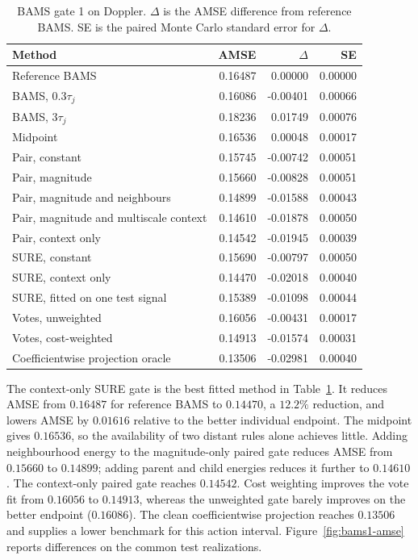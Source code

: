 \documentclass[11pt]{article}
\theoremstyle{plain}
\theoremstyle{definition}
\theoremstyle{remark}
\begin{document}
\begin{table}[!htbp]
\centering
\small
\caption{BAMS gate 1 on Doppler. $\Delta$ is the AMSE difference from reference BAMS. SE is the paired Monte Carlo standard error for $\Delta$.}
\label{tab:bams1-risk}
\begin{tabular}{lrrr}
\toprule
Method & AMSE & $\Delta$ & SE \\
\midrule
Reference BAMS & 0.16487 & 0.00000 & 0.00000 \\
BAMS, $0.3\tau_j$ & 0.16086 & -0.00401 & 0.00066 \\
BAMS, $3\tau_j$ & 0.18236 & 0.01749 & 0.00076 \\
Midpoint & 0.16536 & 0.00048 & 0.00017 \\
Pair, constant & 0.15745 & -0.00742 & 0.00051 \\
Pair, magnitude & 0.15660 & -0.00828 & 0.00051 \\
Pair, magnitude and neighbours & 0.14899 & -0.01588 & 0.00043 \\
Pair, magnitude and multiscale context & 0.14610 & -0.01878 & 0.00050 \\
Pair, context only & 0.14542 & -0.01945 & 0.00039 \\
SURE, constant & 0.15690 & -0.00797 & 0.00050 \\
SURE, context only & 0.14470 & -0.02018 & 0.00040 \\
SURE, fitted on one test signal & 0.15389 & -0.01098 & 0.00044 \\
Votes, unweighted & 0.16056 & -0.00431 & 0.00017 \\
Votes, cost-weighted & 0.14913 & -0.01574 & 0.00031 \\
Coefficientwise projection oracle & 0.13506 & -0.02981 & 0.00040 \\
\bottomrule
\end{tabular}
\end{table}

The context-only SURE gate is the best fitted method in
Table~\ref{tab:bams1-risk}. It reduces AMSE from $0.16487$ for reference BAMS
to $0.14470$, a $12.2\%$ reduction, and lowers AMSE by $0.01616$ relative to the
better individual endpoint. The midpoint gives $0.16536$, so the availability
of two distant rules alone achieves little. Adding neighbourhood energy
to the magnitude-only paired gate reduces AMSE from $0.15660$ to $0.14899$;
adding parent and child energies reduces it further to $0.14610$. The
context-only paired gate reaches $0.14542$. Cost weighting improves the
vote fit from $0.16056$ to $0.14913$, whereas the unweighted gate barely
improves on the better endpoint ($0.16086$). The clean coefficientwise
projection reaches $0.13506$ and supplies a lower benchmark for this
action interval. Figure~\ref{fig:bams1-amse} reports differences on the
common test realizations.
\end{document}
